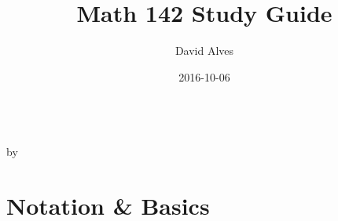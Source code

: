\documentclass[12pt]{article}
\begin{document}

\title{Math 142 Study Guide}
\date{2016-10-06}
\author{David Alves}

\begin{center}
\large \thetitle \\
by \theauthor \\
\end{center}
\tableofcontents

\section{Notation \& Basics}
\newcommand{\termtable}[1]{
    \def\arraystretch{1.75}
    \begin{tabular}{ r|p{28em} }
    #1
    \end{tabular}
}
\newcommand{\term}[1]{\textbf{#1}&}
\end{document}
